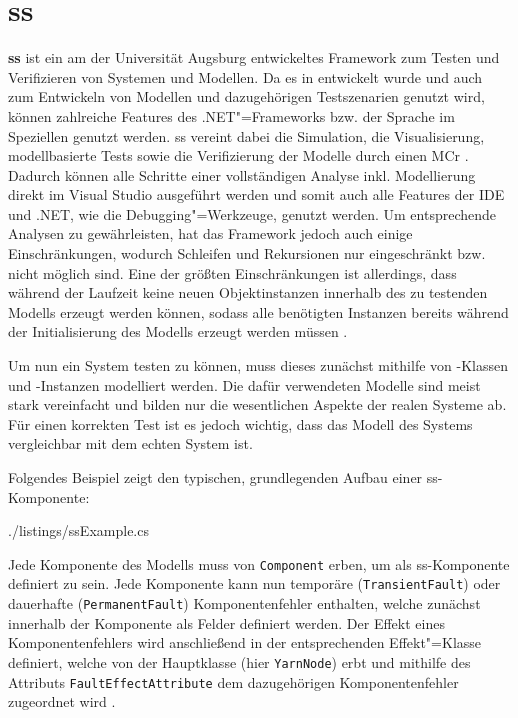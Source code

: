 \section{\acl{ss}}\label{sec:sSharp}

\textbf{\acf{ss}} ist ein am \isse der Universität Augsburg entwickeltes Framework zum Testen und Verifizieren von Systemen und Modellen.
Da es in \cS entwickelt wurde und \cS auch zum Entwickeln von Modellen und dazugehörigen Testszenarien genutzt wird, können zahlreiche Features des .NET"=Frameworks bzw. der Sprache \cS im Speziellen genutzt werden.
\ac{ss} vereint dabei die Simulation, die Visualisierung, modellbasierte Tests sowie die Verifizierung der Modelle durch einen \ac{MCr} \cite{Habermaier2015,Habermaier2016}.
Dadurch können alle Schritte einer vollständigen Analyse inkl. Modellierung direkt im Visual Studio ausgeführt werden und somit auch alle Features der IDE und .NET, wie \zB die Debugging"=Werkzeuge, genutzt werden.
Um entsprechende Analysen zu gewährleisten, hat das Framework jedoch auch einige Einschränkungen, wodurch \zB Schleifen und Rekursionen nur eingeschränkt bzw. nicht möglich sind.
Eine der größten Einschränkungen ist allerdings, dass während der Laufzeit keine neuen Objektinstanzen innerhalb des zu testenden Modells erzeugt werden können, sodass alle benötigten Instanzen bereits während der Initialisierung des Modells erzeugt werden müssen \cite{Habermaier2015}.

Um nun ein System testen zu können, muss dieses zunächst mithilfe von \cS-Klassen und -Instanzen modelliert werden.
Die dafür verwendeten Modelle sind meist stark vereinfacht und bilden nur die wesentlichen Aspekte der realen Systeme ab.
Für einen korrekten Test ist es jedoch wichtig, dass das Modell des Systems vergleichbar mit dem echten System ist.

Folgendes Beispiel zeigt den typischen, grundlegenden Aufbau einer \ac{ss}-Komponente:


{./listings/ssExample.cs}

Jede Komponente des Modells muss von \texttt{Component} erben, um als \ac{ss}-Komponente definiert zu sein.
Jede Komponente kann nun temporäre (\texttt{TransientFault}) oder dauerhafte (\texttt{PermanentFault}) Komponentenfehler enthalten, welche zunächst innerhalb der Komponente als Felder definiert werden. 
Der Effekt eines Komponentenfehlers wird anschließend in der entsprechenden Effekt"=Klasse definiert, welche von der Hauptklasse (hier \texttt{YarnNode}) erbt und mithilfe des Attributs \texttt{FaultEffectAttribute} dem dazugehörigen Komponentenfehler zugeordnet wird \cite{Habermaier2016}.

